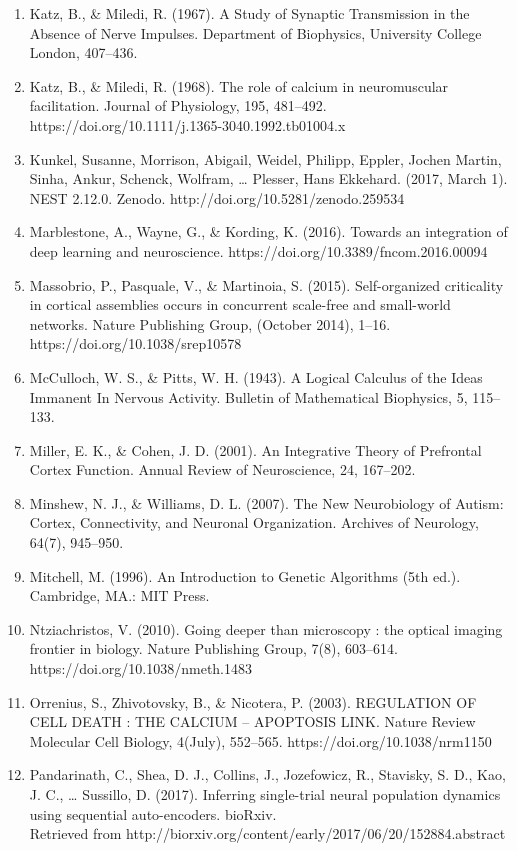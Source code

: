 \documentclass[11pt]{article}
\begin{document}
\begin{enumerate}
\item Katz, B., \& Miledi, R. (1967). A Study of Synaptic Transmission in the Absence of Nerve Impulses. Department of Biophysics, University College London, 407–436.
\item Katz, B., \& Miledi, R. (1968). The role of calcium in neuromuscular facilitation. Journal of Physiology, 195, 481–492. https://doi.org/10.1111/j.1365-3040.1992.tb01004.x
\item Kunkel, Susanne, Morrison, Abigail, Weidel, Philipp, Eppler, Jochen Martin, Sinha, Ankur, Schenck, Wolfram, … Plesser, Hans Ekkehard. (2017, March 1). NEST 2.12.0. Zenodo. http://doi.org/10.5281/zenodo.259534
\item Marblestone, A., Wayne, G., \& Kording, K. (2016). Towards an integration of deep learning and neuroscience. https://doi.org/10.3389/fncom.2016.00094
\item Massobrio, P., Pasquale, V., \& Martinoia, S. (2015). Self-organized criticality in cortical assemblies occurs in concurrent scale-free and small-world networks. Nature Publishing Group, (October 2014), 1–16. https://doi.org/10.1038/srep10578
\item McCulloch, W. S., \& Pitts, W. H. (1943). A Logical Calculus of the Ideas Immanent In Nervous Activity. Bulletin of Mathematical Biophysics, 5, 115–133.
\item Miller, E. K., \& Cohen, J. D. (2001). An Integrative Theory of Prefrontal Cortex Function. Annual Review of Neuroscience, 24, 167–202.
\item Minshew, N. J., \& Williams, D. L. (2007). The New Neurobiology of Autism: Cortex, Connectivity, and Neuronal Organization. Archives of Neurology, 64(7), 945–950.
\item Mitchell, M. (1996). An Introduction to Genetic Algorithms (5th ed.). Cambridge, MA.: MIT Press.
\item Ntziachristos, V. (2010). Going deeper than microscopy : the optical imaging frontier in biology. Nature Publishing Group, 7(8), 603–614. https://doi.org/10.1038/nmeth.1483
\item Orrenius, S., Zhivotovsky, B., \& Nicotera, P. (2003). REGULATION OF CELL DEATH : THE CALCIUM – APOPTOSIS LINK. Nature Review Molecular Cell Biology, 4(July), 552–565. https://doi.org/10.1038/nrm1150
\item Pandarinath, C., Shea, D. J., Collins, J., Jozefowicz, R., Stavisky, S. D., Kao, J. C., … Sussillo, D. (2017). Inferring single-trial neural population dynamics using sequential auto-encoders. bioRxiv.\\Retrieved from http://biorxiv.org/content/early/2017/06/20/152884.abstract

\end{enumerate}
\end{document}
